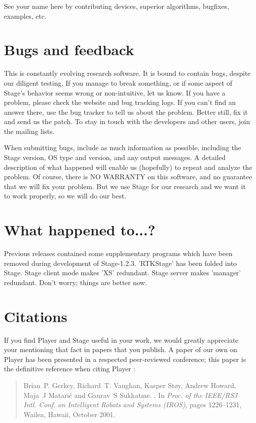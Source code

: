 \documentclass[11pt,twoside]{report}
\def\VERSION {1.2.3}
\begin{document}
	See your name here by contributing devices, superior
	algorithms, bugfixes, examples, etc.

  \section{Bugs and feedback}
  
    This is constantly evolving research software. It is bound to
    contain bugs, despite our diligent testing.  If you manage to
    break something, or if some aspect of Stage's behavior seems wrong
    or non-intuitive, let us know. If you have a problem, please check
    the website and bug tracking logs. If you can't find an answer
    there, use the bug tracker to tell us about the problem. Better
    still, fix it and send us the patch. To stay in touch with the
    developers and other users, join the mailing lists.

    When submitting bugs, include as much information as possible,
    including the Stage version, OS type and version, and any output
    messages.  A detailed description of what happened will enable us
    (hopefully) to repeat and analyze the problem.  Of course, there
    is NO WARRANTY on this software, and no guarantee that we will fix
    your problem.  But we use Stage for our research and we want it to
    work properly, so we will do our best.

  \section{What happened to...?}
	
	Previous releases contained some supplementary programs which
	have been removed during development of
	Stage-\VERSION. 'RTKStage' has been folded into Stage. Stage
	client mode makes 'XS' redundant. Stage server makes 'manager'
	redundant. Don't worry; things are better now.

\section{Citations}
If you find Player and Stage useful in your work, we would greatly
appreciate your mentioning that fact in papers that you publish.  A
paper of our own on Player has been presented in a respected
peer-reviewed conference; this paper is the definitive reference when
citing Player \cite{GerkeyVaughan01a}:
\begin{quote}
Brian~P. Gerkey, Richard~T. Vaughan, Kasper St\o{}y, Andrew Howard,
Maja~J Matari\'c and Gaurav~S Sukhatme.
.
\newblock In {\em Proc. of the IEEE/RSJ Intl. Conf. on Intelligent Robots and
  Systems (IROS)}, pages 1226--1231, Wailea, Hawaii, October 2001.
\end{quote}
\end{document}
